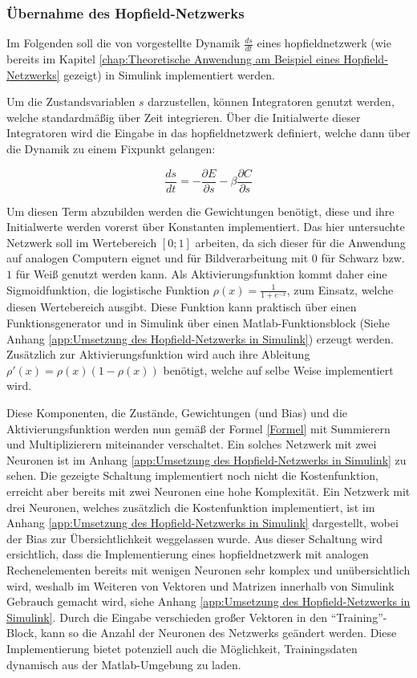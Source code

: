 \subsubsection{Übernahme des Hopfield-Netzwerks}
\label{chap:Übernahme des Hopfield-Netzwerks}

Im Folgenden soll die von \citeauthor{Scellier2017} vorgestellte Dynamik \(\frac{ds}{dt}\) eines \gls{hopfieldnetzwerk} (wie bereits im Kapitel \ref{chap:Theoretische Anwendung am Beispiel eines Hopfield-Netzwerks} gezeigt) in Simulink implementiert werden.

Um die Zustandsvariablen \(s\) darzustellen, können Integratoren genutzt werden, welche standardmäßig über Zeit integrieren. Über die Initialwerte dieser Integratoren wird die Eingabe in das \gls{hopfieldnetzwerk} definiert, welche dann über die Dynamik zu einem Fixpunkt gelangen:

\[\frac{ds}{dt}=-\frac{\partial{E}}{\partial{s}}-\beta\frac{\partial{C}}{\partial{s}}\]

Um diesen Term abzubilden werden die Gewichtungen benötigt, diese und ihre Initialwerte werden vorerst über Konstanten implementiert. Das hier untersuchte Netzwerk soll im Wertebereich \([0; 1]\) arbeiten, da sich dieser für die Anwendung auf analogen Computern eignet und für \zb Bildverarbeitung mit \(0\) für Schwarz bzw. \(1\) für Weiß genutzt werden kann. Als Aktivierungsfunktion kommt daher eine Sigmoidfunktion, die logistische Funktion \(\rho(x)=\frac{1}{1+e^{-x}}\), zum Einsatz, welche diesen Wertebereich ausgibt. Diese Funktion kann praktisch über einen Funktionsgenerator und in Simulink über einen Matlab-Funktionsblock (Siehe Anhang \ref{app:Umsetzung des Hopfield-Netzwerks in Simulink}) erzeugt werden. Zusätzlich zur Aktivierungsfunktion wird auch ihre Ableitung \(\rho'(x)=\rho(x)(1-\rho(x))\) benötigt, welche auf selbe Weise implementiert wird.

Diese Komponenten, die Zustände, Gewichtungen (und Bias) und die Aktivierungsfunktion werden nun gemäß der Formel \ref{Formel} mit Summierern und Multiplizierern miteinander verschaltet. Ein solches Netzwerk mit zwei Neuronen ist im Anhang \ref{app:Umsetzung des Hopfield-Netzwerks in Simulink} zu sehen. Die gezeigte Schaltung implementiert noch nicht die Kostenfunktion, erreicht aber bereits mit zwei Neuronen eine hohe Komplexität. Ein Netzwerk mit drei Neuronen, welches zusätzlich die Kostenfunktion implementiert, ist im Anhang \ref{app:Umsetzung des Hopfield-Netzwerks in Simulink} dargestellt, wobei der Bias zur Übersichtlichkeit weggelassen wurde. Aus dieser Schaltung wird ersichtlich, dass die Implementierung eines \gls{hopfieldnetzwerk} mit analogen Rechenelementen bereits mit wenigen Neuronen sehr komplex und unübersichtlich wird, weshalb im Weiteren von Vektoren und Matrizen innerhalb von Simulink Gebrauch gemacht wird, siehe Anhang \ref{app:Umsetzung des Hopfield-Netzwerks in Simulink}. Durch die Eingabe verschieden großer Vektoren in den "`Training"'-Block, kann so die Anzahl der Neuronen des Netzwerks geändert werden. Diese Implementierung bietet potenziell auch die Möglichkeit, Trainingsdaten dynamisch aus der Matlab-Umgebung zu laden.
